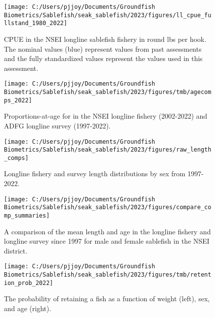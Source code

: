 \documentclass[
]{article}
\begin{document}
\begin{figure}[H]

{\centering \texttt{[image: C:/Users/pjjoy/Documents/Groundfish Biometrics/Sablefish/seak\_sablefish/2023/figures/ll\_cpue\_fullstand\_1980\_2022]} 

}

\caption{CPUE in the NSEI longline sablefish fishery in round lbs per hook.  The nominal values (blue) represent values from past assessments and the fully standardized values represent the values used in this assessment.}\label{fig:fcpuestand}
\end{figure}

\begin{figure}[H]

{\centering \texttt{[image: C:/Users/pjjoy/Documents/Groundfish Biometrics/Sablefish/seak\_sablefish/2023/figures/tmb/agecomps\_2022]} 

}

\caption{Proportions-at-age for in the NSEI longline fishery (2002-2022) and ADFG longline survey (1997-2022).}\label{fig:agecomps}
\end{figure}

\begin{figure}[H]

{\centering \texttt{[image: C:/Users/pjjoy/Documents/Groundfish Biometrics/Sablefish/seak\_sablefish/2023/figures/raw\_length\_comps]} 

}

\caption{Longline fishery and survey length distributions by sex from 1997-2022.}\label{fig:lencomp}
\end{figure}

\begin{figure}[H]

{\centering \texttt{[image: C:/Users/pjjoy/Documents/Groundfish Biometrics/Sablefish/seak\_sablefish/2023/figures/compare\_comp\_summaries]} 

}

\caption{A comparison of the mean length and age in the longline fishery and longline survey since 1997 for male and female sablefish in the NSEI district.}\label{fig:compcomps}
\end{figure}

\begin{figure}[H]

{\centering \texttt{[image: C:/Users/pjjoy/Documents/Groundfish Biometrics/Sablefish/seak\_sablefish/2023/figures/tmb/retention\_prob\_2022]} 

}

\caption{The probability of retaining a fish as a function of weight (left), sex, and age (right).}\label{fig:retention}
\end{figure}
\end{document}
